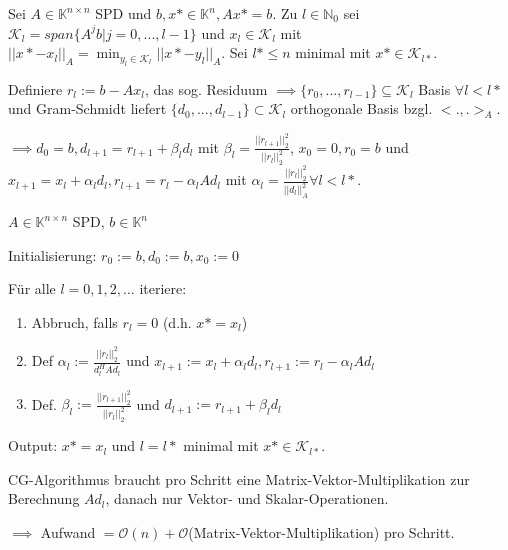 \begin{theorem}
	Sei $A \in \mathbb{K}^{n\times n}$ SPD und $b, x* \in \mathbb{K}^n, Ax* = b$. Zu $l \in \mathbb{N}_0$ sei $\mathcal{K}_l = span\{A^jb | j=0, ..., l-1\}$ und $x_l \in \mathcal{K}_l$ mit $||x* - x_l||_A = \min_{y_l \in \mathcal{K}_l} ||x* - y_l||_A$. Sei $l* \leq n$ minimal mit $x* \in \mathcal{K}_{l*}$.
	
	Definiere $r_l := b-Ax_l$, das sog. Residuum $\implies \{r_0, ..., r_{l-1}\} \subseteq \mathcal{K}_l$ Basis $\forall l < l*$ und Gram-Schmidt liefert $\{d_0, ..., d_{l-1}\} \subset \mathcal{K}_l$ orthogonale Basis bzgl. $<., .>_A$.
	
	$\implies d_0 = b, d_{l+1} = r_{l+1} + \beta_l d_l$ mit $\beta_l = \frac{||r_{l+1}||_2^2}{||r_l||_2^2}$, $x_0=0, r_0=b$ und $x_{l+1} = x_l + \alpha_l d_l, r_{l+1} = r_l - \alpha_l A d_l$ mit $\alpha_l = \frac{||r_l||_2^2}{||d_l||_A^2} \forall l < l*$.
\end{theorem}

\begin{algorithm}
	$A \in \mathbb{K}^{n \times n}$ SPD, $b \in \mathbb{K}^n$
	
	Initialisierung: $r_0 := b, d_0 := b, x_0 := 0$
	
	Für alle $l=0,1,2,...$ iteriere:
	\begin{enumerate}
		\item Abbruch, falls $r_l = 0$ (d.h. $x* = x_l$)
		\item Def $\alpha_l := \frac{||r_l||_2^2}{d_l^H A d_l}$ und $x_{l+1} := x_l + \alpha_l d_l, r_{l+1} := r_l - \alpha_l A d_l$
		\item Def. $\beta_l := \frac{||r_{l+1}||_2^2}{||r_l||_2^2}$ und $d_{l+1} := r_{l+1} + \beta_l d_l$
	\end{enumerate}
	
	Output: $x* = x_l$ und $l = l*$ minimal mit $x* \in \mathcal{K}_{l*}$.
\end{algorithm}

\begin{remark}
	CG-Algorithmus braucht pro Schritt eine Matrix-Vektor-Multiplikation zur Berechnung $Ad_l$, danach nur Vektor- und Skalar-Operationen.
	
	$\implies$ Aufwand $=\mathcal{O}(n) + \mathcal{O}$(Matrix-Vektor-Multiplikation) pro Schritt.
\end{remark}

